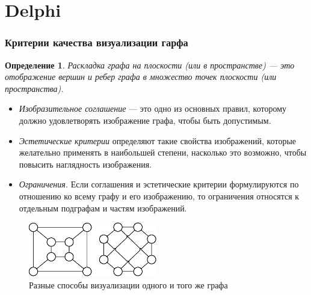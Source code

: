 \documentclass{beamer}
\begin{document}
\section{Delphi}
\begin{frame}
\frametitle{Критерии качества визуализации гарфа}
\tiny{
	\newtheorem{vis}{Определение}
	\begin{vis}
	Раскладка графа на плоскости (или в пространстве) — это отображение вершин и ребер графа в множество точек плоскости (или пространства).
	\end{vis}

	\begin{itemize}
	\item \textit{Изобразительное соглашение} — это одно из основных правил, которому должно удовлетворять изображение графа, чтобы быть допустимым.

	\item \textit{Эстетические критерии} определяют такие свойства изображений, которые желательно применять в наибольшей степени, насколько это возможно, чтобы повысить наглядность изображения.

	\item \textit{Ограничения.} Если соглашения и эстетические критерии формулируются по отношению ко всему графу и его изображению, то ограничения относятся к отдельным подграфам и частям изображений.
\end{itemize}

	\begin{figure}[htbp]
		\centering
			\includegraphics[width=0.50\textwidth]{Pic/Pic1.eps}
		\caption{Разные способы визуализации одного и того же графа}
		\label{fig:VisExample}
	\end{figure}
}
\end{frame}

\end{document}
